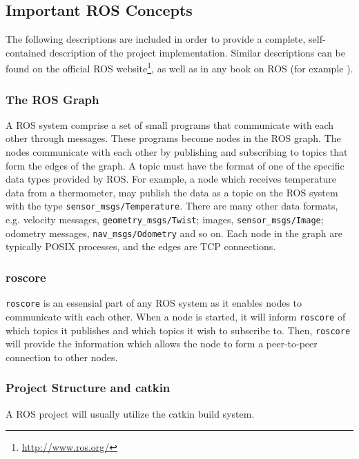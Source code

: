 \subsection{Important ROS Concepts}

The following descriptions are included in order to provide a complete, self-contained description of the project implementation. Similar descriptions can be found on the official \ac{ROS} website\footnote{\url{http://www.ros.org/}}, as well as in any book on \ac{ROS} (for example \cite{rosbook15}). 

\subsubsection{The ROS Graph}

A \ac{ROS} system comprise a set of small programs that communicate with each other through messages. These programs become nodes in the \ac{ROS} graph. The nodes communicate with each other by publishing and subscribing to topics that form the edges of the graph. A topic must have the format of one of the specific data types provided by \ac{ROS}. For example, a node which receives temperature data from a thermometer, may publish the data as a topic on the \ac{ROS} system with the type \texttt{sensor\_msgs/Temperature}. There are many other data formats, e.g. velocity messages, \texttt{geometry\_msgs/Twist}; images, \texttt{sensor\_msgs/Image}; odometry messages, \texttt{nav\_msgs/Odometry} and so on. Each node in the graph are typically POSIX processes, and the edges are TCP connections\cite{rosbook15}.

\subsubsection{roscore}

\texttt{roscore} is an essensial part of any \ac{ROS} system as it enables nodes to communicate with each other. When a node is started, it will inform \texttt{roscore} of which topics it publishes and which topics it wish to subscribe to. Then, \texttt{roscore} will provide the information which allows the node to form a peer-to-peer connection to other nodes.

\subsubsection{Project Structure and catkin}

A \ac{ROS} project will usually utilize the catkin build system.




